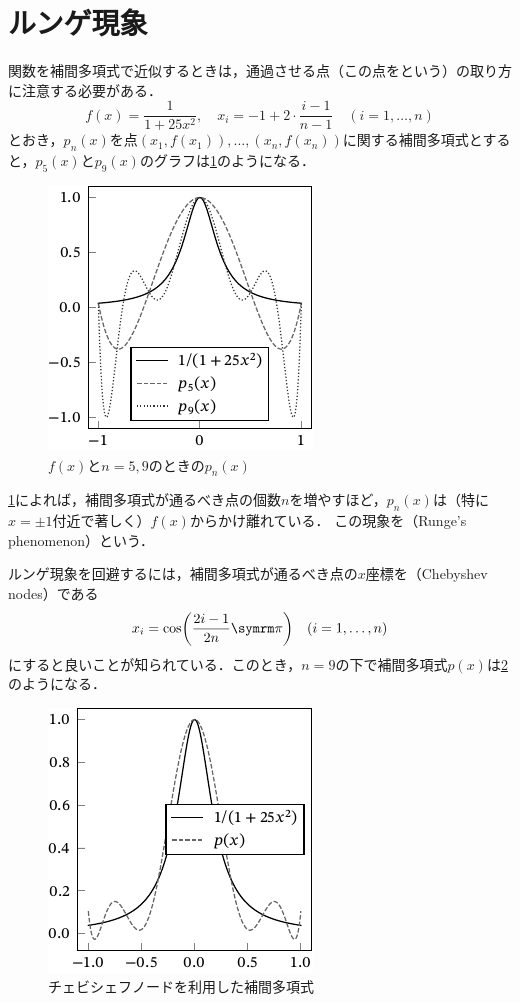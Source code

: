 \documentclass[../../numcalc]{subfiles}
\begin{document}
\section{ルンゲ現象}
関数を補間多項式で近似するときは，通過させる点（この点をという）の取り方に注意する必要がある．
\[
  f(x) = \frac{1}{1+25x^2},
  \quad x_i = -1+2\cdot\frac{i-1}{n-1}\quad(i=1,\dots,n)
\]
とおき，\(p_n(x)\)を点\((x_1,f(x_1)),\dots,(x_n,f(x_n))\)に関する補間多項式とすると，\(p_5(x)\)と\(p_9(x)\)のグラフは\cref{figure:runge}のようになる．

\begin{figure}[htbp]
  \centering
  \includegraphics{runge.pdf}
  \caption{\(f(x)\)と\(n=5,9\)のときの\(p_n(x)\)}
  \label{figure:runge}
\end{figure}

\cref{figure:runge}によれば，補間多項式が通るべき点の個数\(n\)を増やすほど，\(p_n(x)\)は（特に\(x=\pm 1\)付近で著しく）\(f(x)\)からかけ離れている．
この現象を（Runge's phenomenon）という．

ルンゲ現象を回避するには，補間多項式が通るべき点の\(x\)座標を（Chebyshev nodes）である
\[
  x_i = \cos\pqty*{\frac{2i-1}{2n}\krez}\quad (i=1,\dots,n)
\]
にすると良いことが知られている\cite{horinouchi2015}．このとき，\(n=9\)の下で補間多項式\(p(x)\)は\cref{figure:chebyshev}のようになる．

\begin{figure}[htbp]
  \centering
  \includegraphics{chebyshev.pdf}
  \caption{チェビシェフノードを利用した補間多項式}
  \label{figure:chebyshev}
\end{figure}
\end{document}
